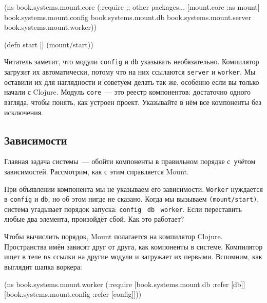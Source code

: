 \label{mount-main}

\begin{english}
  \begin{clojure}
(ns book.systems.mount.core
  (:require
   ;; other packages...
   [mount.core :as mount]
   book.systems.mount.config
   book.systems.mount.db
   book.systems.mount.server
   book.systems.mount.worker))

(defn start []
  (mount/start))
  \end{clojure}
\end{english}

Читатель заметит, что модули \verb|config| и \verb|db| указывать
необязательно. Компилятор загрузит их автоматически, потому что на них ссылаются
\verb|server| и \verb|worker|. Мы оставили их для наглядности и советуем делать так
же, особенно если вы только начали с Clojure. Модуль \verb|core|~--- это реестр
компонентов: достаточно одного взгляда, чтобы понять, как устроен
проект. Указывайте в нём все компоненты без исключения.

\subsection{Зависимости}


Главная задача системы~--- обойти компоненты в правильном порядке с~учётом
зависимостей. Рассмотрим, как с этим справляется Mount.

При объявлении компонента мы не указываем его зависимости. \verb|Worker|
нуждается в \verb|config| и \verb|db|, но об этом нигде не сказано. Когда мы
вызываем \verb|(mount/start)|, система угадывает порядок запуска:
\verb|config|~\arr{} \verb|db|~\arr{} \verb|worker|. Если переставить любые два
элемента, произойдёт сбой. Как это работает?

Чтобы вычислить порядок, Mount полагается на компилятор Clojure. Пространства
имён зависят друг от друга, как компоненты в системе. Компилятор ищет в теле
\verb|ns| ссылки на другие модули и загружает их первыми. Вспомним, как
выглядит шапка воркера:

\begin{english}
  \begin{clojure}
(ns book.systems.mount.worker
  (:require
   [book.systems.mount.db :refer [db]]
   [book.systems.mount.config :refer [config]]))
  \end{clojure}
\end{english}

